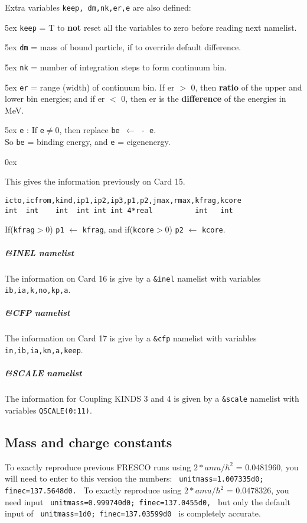 \documentclass[11pt]{article}
\begin{document}
\bigskip
Extra variables {\tt keep, dm,nk,er,e} are also defined:

\hangindent 5ex
{\tt keep} = T to {\bf not} reset all the variables to zero before reading next namelist.

\hangindent 5ex
{\tt dm} = mass of bound particle, if to override default difference.

\hangindent 5ex
{\tt nk} = number of integration steps to form continuum bin.

\hangindent 5ex
{\tt er} = range (width) of continuum bin. 
If er $>$ 0, then {\bf ratio} of the upper and lower bin
energies; and if er $<$ 0, then er is the  {\bf difference} of the energies in MeV.

\hangindent 5ex
{\tt e} : If {\tt e}$\ne$0, then replace {\tt be $\leftarrow$ - e}.\\
        So {\tt be} = binding energy, and {\tt e} = eigenenergy.

\hangindent 0ex


This gives the information previously on Card 15.
\begin{verbatim}
icto,icfrom,kind,ip1,ip2,ip3,p1,p2,jmax,rmax,kfrag,kcore
int  int    int  int int int 4*real          int   int
\end{verbatim}
If({\tt kfrag}$>$0) {\tt p1} $\leftarrow$ {\tt kfrag}, and
if({\tt kcore}$>$0) {\tt p2} $\leftarrow$ {\tt kcore}.

\subparagraph*{\&INEL namelist}

The information on Card 16 is give by a {\tt \&inel} namelist with variables
{\tt  ib,ia,k,no,kp,a}.


\subparagraph*{\&CFP namelist}

The information on Card 17 is give by a {\tt \&cfp} namelist with variables
{\tt in,ib,ia,kn,a,keep}.

\subparagraph*{\&SCALE namelist}

The information for Coupling KINDS 3 and 4  is given by a {\tt \&scale} namelist with
variables {\tt QSCALE(0:11)}.

\bigskip
\subsection*{Mass and charge constants}
To exactly reproduce previous FRESCO runs using $2*amu/\hbar^2$ = 0.0481960,
you will need to enter to this version the numbers:
{\tt
        unitmass=1.007335d0; finec=137.5648d0.
}
To exactly reproduce using $2*amu/\hbar^2$ = 0.0478326, you need input
{\tt
        unitmass=0.999740d0; finec=137.0455d0,
}
but only the default input of
{\tt
        unitmass=1d0; finec=137.03599d0
}
is completely accurate.
\end{document}
